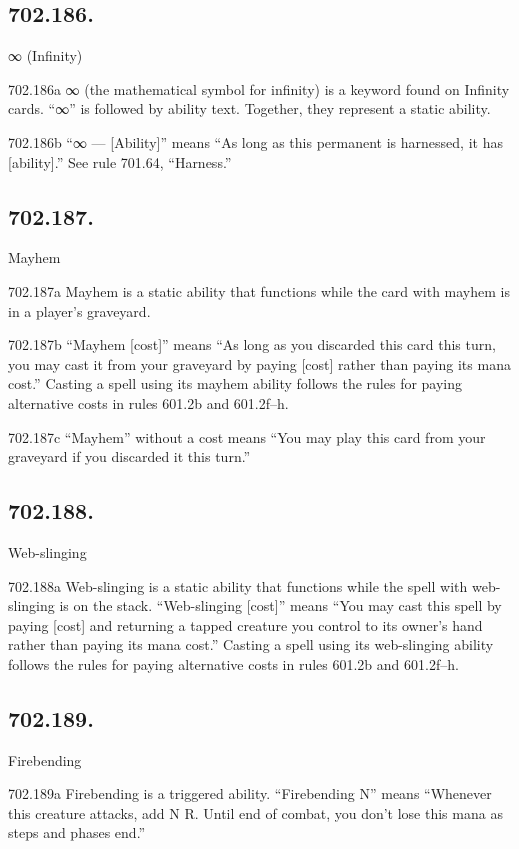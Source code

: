\subsection*{702.186.}
∞ (Infinity)

702.186a ∞ (the mathematical symbol for infinity) is a keyword found on Infinity cards. “∞” is followed by ability text. Together, they represent a static ability.

702.186b “∞ — [Ability]” means “As long as this permanent is harnessed, it has [ability].” See rule 701.64, “Harness.”

\subsection*{702.187.}
Mayhem

702.187a Mayhem is a static ability that functions while the card with mayhem is in a player’s graveyard.

702.187b “Mayhem [cost]” means “As long as you discarded this card this turn, you may cast it from your graveyard by paying [cost] rather than paying its mana cost.” Casting a spell using its mayhem ability follows the rules for paying alternative costs in rules 601.2b and 601.2f–h.

702.187c “Mayhem” without a cost means “You may play this card from your graveyard if you discarded it this turn.”

\subsection*{702.188.}
Web-slinging

702.188a Web-slinging is a static ability that functions while the spell with web-slinging is on the stack. “Web-slinging [cost]” means “You may cast this spell by paying [cost] and returning a tapped creature you control to its owner’s hand rather than paying its mana cost.” Casting a spell using its web-slinging ability follows the rules for paying alternative costs in rules 601.2b and 601.2f–h.

\subsection*{702.189.}
Firebending

702.189a Firebending is a triggered ability. “Firebending N” means “Whenever this creature attacks, add N {R}. Until end of combat, you don’t lose this mana as steps and phases end.”

